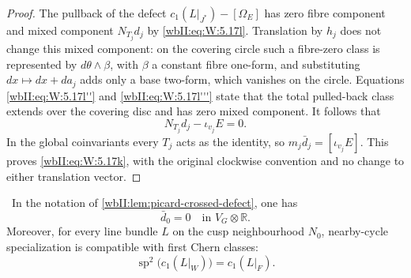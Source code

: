 \begin{proof}
The pullback of the defect
\(c_1(L|_{J^*})-[\Omega_E]\) has zero fibre component and mixed
component \(N_{T_j}d_j\) by \eqref{wbII:eq:W:5.17l}.  Translation by \(h_j\) does
not change this mixed component: on the covering circle such
a fibre-zero class is represented by
\(d\theta\wedge\beta\), with \(\beta\) a constant fibre one-form,
and substituting \(dx\mapsto dx+d a_j\) adds only a base two-form,
which vanishes on the circle.  Equations \eqref{wbII:eq:W:5.17l''} and
\eqref{wbII:eq:W:5.17l'''} state that the total pulled-back class extends over
the covering disc and has zero mixed component.  It follows that
\[
 N_{T_j}d_j-\iota_{v_j}E=0.
\]
In the global coinvariants every \(T_j\) acts as the identity,
so \(m_j\bar d_j=[\iota_{v_j}E]\).  This proves \eqref{wbII:eq:W:5.17k}, with the
original clockwise convention and no change to either translation
vector.
\end{proof}

\begin{lemma}
\label{wbII:lem:picard-cusp-defect}
\ In the notation of
\cref{wbII:lem:picard-crossed-defect}, one has
\[
 \bar d_0=0\quad\text{in }V_G\otimes\mathbb R.
\tag{W.36}\label{wbII:eq:W:5.17n}
\]
Moreover, for every line bundle $L$ on the cusp neighbourhood $N_0$,
nearby-cycle specialization is compatible with first Chern classes:
\[
 \operatorname{sp}^2\bigl(c_1(L|_W)\bigr)=c_1(L|_F).
\tag{W.37}\label{wbII:eq:W:5.17o}
\]
\end{lemma}

